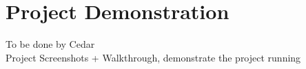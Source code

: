 \section{Project Demonstration}
To be done by Cedar\\
Project Screenshots + Walkthrough, demonstrate the project running
